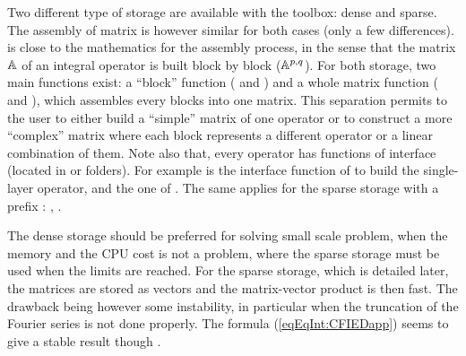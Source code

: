 Two different type of storage are available with the \mudiff toolbox: dense and sparse. The assembly of matrix is however similar for both cases (only a few differences). \mudiff is close to the mathematics for the assembly process, in the sense that the matrix ${\mathbb{A}}$ of an integral operator is built block by block ($\mathbb{A}^{p,q}$). For both storage, two main functions exist: a ``block'' function ( and ) and a whole matrix function ( and ), which assembles every blocks into one matrix. This separation permits to the user to either build a ``simple'' matrix of one operator or to construct a more ``complex'' matrix where each block represents a different operator or a linear combination of them. Note also that, every operator has functions of interface (located in  or  folders). For example  is the interface function of  to build the single-layer operator, and  the one of . The same applies for the sparse storage with a prefix :  ,  .


The dense storage should be preferred for solving small scale problem, when the memory and the CPU cost is not a problem, where the sparse storage must be used when the limits are reached. For the sparse storage, which is detailed later, the matrices are stored as vectors and the matrix-vector product is then fast. The drawback being however some instability, in particular when the truncation of the Fourier series is not done properly. The formula (\ref{eqEqInt:CFIEDapp}) seems to give a stable result though \cite{AntChnRam08}.



